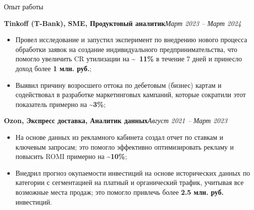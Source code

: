 \documentclass[]{mcdowellcv}
\renewenvironment{cvsubsection}[2]{%
  \begin{adjustwidth}{\subsectionmargin}{\subsectionmargin}%
    {\bfseries #1}\hfill #2\par\vspace{0.5em}%
}{%
  \end{adjustwidth}%
  \vspace*{\aftersubsectionspace}%
}
\begin{document}
\begin{cvsection}{\Large Опыт работы}
        \begin{cvsubsection}{Tinkoff (T-Bank), SME, Продуктовый аналитик}{\textit{Март 2023 -- Март 2024}}
            \begin{itemize}
                \item Провел исследование и запустил эксперимент по внедрению нового процесса обработки заявок на создание индивидуального предпринимательства, что помогло увеличить CR утилизации на \textbf{\textasciitilde ~11\%} в течение 7 дней и принесло доход более \textbf{1 млн. руб.};
                \item Выявил причину возросшего оттока по дебетовым (бизнес) картам и содействовал в разработке маркетинговых кампаний, которые сократили этот показатель примерно на \textbf{\textasciitilde 3\%};
            \end{itemize}
        \end{cvsubsection}
        
        \begin{cvsubsection}{Ozon, Экспресс доставка, Аналитик данных}{\textit{Август 2021 -- Март 2023}}
            \begin{itemize}
                \item На основе данных из рекламного кабинета создал отчет по ставкам и ключевым запросам; это помогло эффективно оптимизировать рекламу и повысить ROMI примерно на \textbf{\textasciitilde 10\%};
                \item Внедрил прогноз окупаемости инвестиций на основе исторических данных по категории с сегментацией на платный и органический трафик, учитывая все возможные места продаж; это помогло привлечь более \textbf{2.5 млн. руб.} инвестиций.
            \end{itemize}
        \end{cvsubsection}
    \end{cvsection}
    
\end{document}
